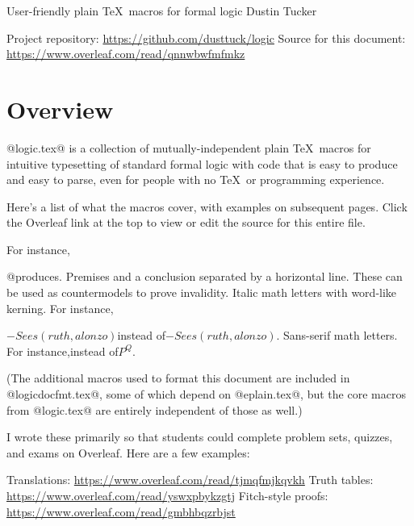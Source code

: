 

\heading
User-friendly plain \TeX\ macros for formal logic
Dustin Tucker
\resetat{}
\strut
Project repository: \url{https://github.com/dusttuck/logic}
Source for this document: \url{https://www.overleaf.com/read/qnnwbwfmfmkz}
\endheading

\section{Overview}

@logic.tex@ is a collection of mutually-independent plain \TeX\ macros for intuitive typesetting of standard formal logic with code that is easy to produce and easy to parse, even for people with no \TeX\ or programming experience.

Here's a list of what the macros cover, with examples on subsequent pages. Click the Overleaf link at the top to view or edit the source for this entire file.

\unorderedlist
{} For instance,\logicstrut{0pt}{9.5pt}
\linebreak\strut\hfil@Ax[F(x) > -G(x,a)]@\qquad produces.
 Premises and a conclusion separated by a horizontal line.
 These can be used as countermodels to prove invalidity.
\li@{} Italic math letters with word-like kerning. For instance,\logicstrut{0pt}{9.5pt}
\linebreak\strut\hfil{\itmath$-Sees(ruth,alonzo)$}\qquad instead of\qquad$-Sees(ruth,alonzo)$.
\li@{} Sans-serif math letters. For instance,\qquad instead of\qquad$P^Q$.
\endunorderedlist

(The additional macros used to format this document are included in @logicdocfmt.tex@, some of which depend on @eplain.tex@, but the core macros from @logic.tex@ are entirely independent of those as well.)

I wrote these primarily so that students could complete problem sets, quizzes, and exams on Overleaf. Here are a few examples:

\unorderedlist\interitemskipamount=6pt
\li Translations: \url{https://www.overleaf.com/read/tjmqfmjkqvkh}
\li Truth tables: \url{https://www.overleaf.com/read/yswxpbykzgtj}
\li Fitch-style proofs: \url{https://www.overleaf.com/read/gmbhbqzrbjst}
\endunorderedlist

